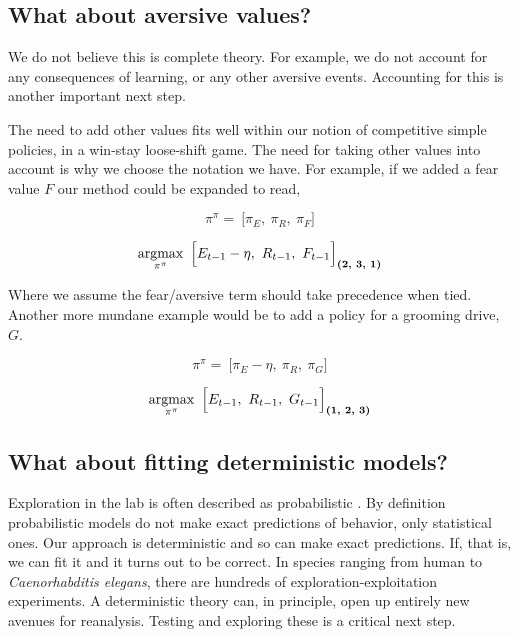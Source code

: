 \subsection*{What about aversive values?}
We do not believe this is complete theory. For example, we do not account for any consequences of learning, or any other aversive events. Accounting for this is another important next step.

The need to add other values fits well within our notion of competitive simple policies, in a win-stay loose-shift game. The need for taking other values into account is why we choose the notation we have. For example, if we added a fear value $F$ our method could be expanded to read,

\begin{equation}
\label{eq:pipi_f} 
\pi^{\pi} = \ \Big [ \pi_E,\ \pi_R,\ \pi_F \Big ]
\end{equation}

\begin{equation}
\label{eq:meta_greedy_f} 
	\operatorname*{argmax}_{\pi^{\pi}} \ \Big [ E_{t-1} - \eta,\ R_{t-1},\ F_{t-1} \Big ]_{\textbf{(2, 3, 1)}}
\end{equation}

Where we assume the fear/aversive term should take precedence when tied. Another more mundane example would be to add a policy for a grooming drive, $G$. 

\begin{equation}
\label{eq:pipi_g} 
\pi^{\pi} = \ \Big [ \pi_E - \eta,\ \pi_R,\ \pi_G \Big ]
\end{equation}

\begin{equation}
\label{eq:meta_greedy_g} 
	\operatorname*{argmax}_{\pi^{\pi}} \ \Big [ E_{t-1},\ R_{t-1},\ G_{t-1} \Big ]_{\textbf{(1, 2, 3)}}
\end{equation}

\subsection*{What about fitting deterministic models?}
Exploration in the lab is often described as probabilistic \citep{Calhoun2014,Song2019a,Gershman2018b,Schulz2018a}. By definition probabilistic models do not make exact predictions of behavior, only statistical ones. Our approach is deterministic and so can make exact predictions. If, that is, we can fit it and it turns out to be correct. In species ranging from human to \textit{Caenorhabditis elegans}, there are hundreds of exploration-exploitation experiments. A deterministic theory can, in principle, open up entirely new avenues for reanalysis. Testing and exploring these is a critical next step.


